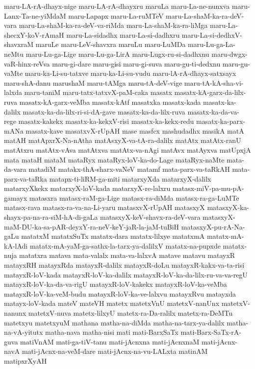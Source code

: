 {maru-LA-rA-dhayx-nige
maru-LA-rA-dhayxru
maruLa
maru-La-ne-nunxva
maru-Lanx-Ta-ne-yiMdaM
maru-Lapapx
maru-La-ruMTeV
maru-La-shaM-ka-ra-deV-vara
maru-La-shaM-ka-ra-deV-va-riMda
maru-La-shaM-ka-ra-liMga
maru-La-shecxY-koV-rAmaH
maru-La-sidadhx
maru-La-si-dadhxru
maru-La-si-dedhxV-shavxraM
maruLe
maru-LeV-shavxra
maruLu
maru-LuMDa
maru-Lu-ga-La-neMtu
maru-Lu-ga-Lige
maru-Lu-ga-LirA
maru-Lugx-ru-si-dadhxnu
maru-dwgx-vaR-hinx-reVva
maru-gi-dare
maru-gisi
maru-gi-suva
maru-gu-ti-dedxnu
maru-gu-vaMte
maru-ka-Li-su-tatxve
maru-ka-Li-su-vudu
maru-lA-rA-dhayx-satxsayx
maru-shA-danu
marushaM
maru-tAMga
maru-tA-deV-vige
maru-tA-kA-sha-vi-lalxda
maru-taniM
maru-tatx-tatxvX-paM-caka
masatx
masatx-kA-garx-da-lilx-ruva
masatx-kA-garx-veMba
masatx-kAtf
masatxka
masatx-kada
masatx-ka-dalilx
masatx-ka-da-lilx-ri-si-dA-gave
masatx-ka-da-lilx-ruva
masatx-ka-da-va-rege
masatx-kakekx
masatx-ka-kekxV-risi
masatx-ka-kekx-redu
masatx-ka-parx-mANa
masatx-kave
masatxvX-rUpAH
mase
masfcx
mashudadhx
masikA
matA
matAH
matApxrX-Na-nAtha
matAsxyX-va-tA-ra-dalilx
matAtx
matAtx-ranU
matAtxru
matAtx-vAva
matAtxva
matAtx-va-nAgi
matAvx
matAyxva
matUpxjA
mata
mataH
mataM
mataRyx
mataRyx-loV-ka-do-Lage
mataRyx-naMte
mata-da-vara
matadiM
matakx-thA-sharx-vaNeV
matamf
mata-parx-va-taRkAH
mata-parx-va-taRka
matapx-ti-liRM-ga-miti
matarxyXda
matarxyX-dalilx
matarxyXkekx
matarxyX-loV-kada
matarxyX-re-lalxru
matasx-miV-pa-mu-pA-gamayx
matasxra
matasx-raM-ga-Lige
matasx-ra-diMda
matasx-ra-ga-LuMTe
matasx-rava
matasx-ra-va-na-Li-yaru
matasxvX-rUpAH
matasxyX
matasxyX-ka-shayx-pa-na-ra-siM-hA-di-gaLa
matasxyX-keV-shavx-ra-deV-vara
matasxyX-maM-DU-ka-sa-pAR-deyxY-ra-neV-keY-jaR-la-jaM-tuBiH
matasxyX-pu-rA-Na-gaLu
matatxM
matatxSuTx
matatx-dara
matatx-lilxye
matatxmA
matatx-mA-kA-lAdi
matatx-mA-yaM-ga-sathx-la-tarx-ya-dalilxV
matatx-na-pupxde
matatx-nuja
matatxra
matava
mata-valalx
mata-va-lalxvA
matave
matavu
matayxR
matayxRH
matayxRda
matayxR-dalilx
matayxR-doLu
matayxR-kakx-va-ta-risi
matayxR-loV-kada
matayxR-loV-ka-dalilx
matayxR-loV-ka-da-lilx-ru-va-va-regU
matayxR-loV-ka-da-va-rigU
matayxR-loV-kakekx
matayxR-loV-ka-veMba
matayxR-loV-ka-veM-budu
matayxR-loV-ka-ve-lalxvu
matayxRvu
matayxda
matayx-loV-kada
mateV
mateVH
matetx
matetxVnU
matetxV-nanUnx
matetxV-nanunx
matetxV-nuva
matetx-lilxyU
matetx-ra-Da-ralilx
matetx-ra-DeMTu
matetxyu
matetxyuM
mathana
matha-na-diMda
matha-na-tarx-ya-dalilx
matha-na-vA-yitutx
matha-nava
matha-nisi
mati
mati-BarxSaTx
mati-Barx-SaTx-rA-guva
matiVnAM
mati-ga-tiV-tanu
mati-jAcnxna
mati-jAcnxnaM
mati-jAcnx-navA
mati-jAcnx-na-veM-dare
mati-jAcnx-na-vu-LALxta
matinAM
matipxrXyAH
}
